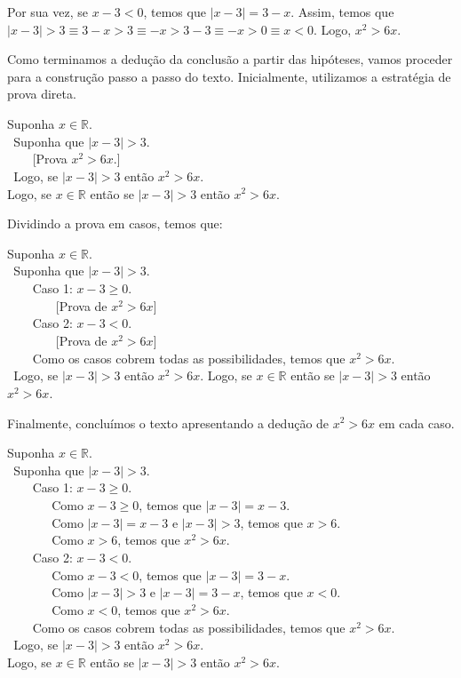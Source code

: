 \begin{Example}
Por sua vez, se $x - 3 < 0$, temos que $|x - 3| = 3 - x$. Assim, temos
que $|x - 3| > 3 \equiv 3 - x > 3 \equiv -x > 3 - 3 \equiv - x > 0
\equiv x < 0$. Logo,  $x^2 > 6x$.

Como terminamos a dedução da conclusão a partir das hipóteses, vamos
proceder para a construção passo a passo do texto. Inicialmente,
utilizamos a estratégia de prova direta.
\begin{flushleft}
Suponha $x\in\mathbb{R}$.\\
\verb| |Suponha que $|x-3| > 3$.\\
\verb|    |[Prova $x^2 > 6x$.]\\
\verb| |Logo, se $|x-3| > 3$ então $x^2 > 6x$.\\
Logo, se $x\in\mathbb{R}$ então se $|x - 3| > 3$ então $x^2 > 6x$.
\end{flushleft}
Dividindo a prova em casos, temos que:
\begin{flushleft}
Suponha $x\in\mathbb{R}$.\\
\verb| |Suponha que $|x-3| > 3$.\\
\verb|    |Caso 1: $x - 3 \geq 0$.\\
\verb|       | [Prova de $x^2 > 6x$]\\
\verb|    |Caso 2: $x - 3 < 0$.\\
\verb|       | [Prova de $x^2 > 6x$]\\
\verb|    |Como os casos cobrem todas as possibilidades, temos que
$x^2 > 6x$.\\
\verb| |Logo, se $|x-3| > 3$ então $x^2 > 6x$.
Logo, se $x\in\mathbb{R}$ então se $|x - 3| > 3$ então $x^2 > 6x$.
\end{flushleft}
Finalmente, concluímos o texto apresentando a dedução de $x^2 > 6x$ em
cada caso.
\begin{flushleft}
Suponha $x\in\mathbb{R}$.\\
\verb| |Suponha que $|x-3| > 3$.\\
\verb|    |Caso 1: $x - 3 \geq 0$.\\
\verb|       |Como $x - 3 \geq 0$, temos que $|x - 3| = x - 3$.\\
\verb|       |Como $|x - 3| = x - 3$ e $|x - 3| > 3$, temos que $x >
6$.\\
\verb|       |Como $x > 6$, temos que $x^2 > 6x$.\\
\verb|    |Caso 2: $x - 3 < 0$.\\
\verb|       |Como $x - 3 < 0$, temos que $|x - 3| = 3 -x$.\\
\verb|       |Como $|x - 3| > 3$ e $|x - 3| = 3 - x$, temos que $x <
0$.\\
\verb|       |Como $x < 0$, temos que $x^2 > 6x$.\\
\verb|    |Como os casos cobrem todas as possibilidades, temos que
$x^2 > 6x$.\\
\verb| |Logo, se $|x-3| > 3$ então $x^2 > 6x$.\\
Logo, se $x\in\mathbb{R}$ então se $|x - 3| > 3$ então $x^2 > 6x$.
\end{flushleft}
\end{Example}

